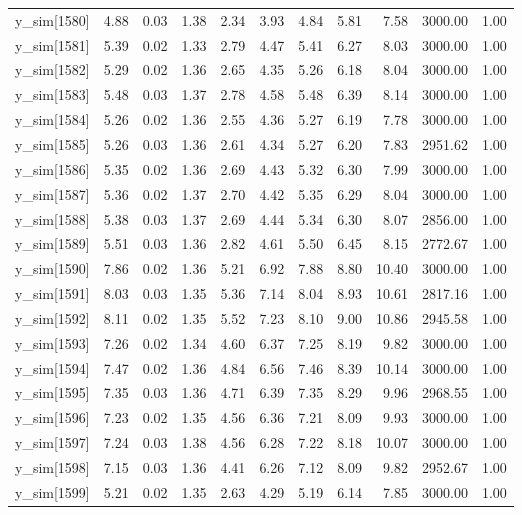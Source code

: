 \begin{table}[ht]
\begin{tabular}{rrrrrrrrrrr}
  y\_sim[1580] & 4.88 & 0.03 & 1.38 & 2.34 & 3.93 & 4.84 & 5.81 & 7.58 & 3000.00 & 1.00 \\ 
  y\_sim[1581] & 5.39 & 0.02 & 1.33 & 2.79 & 4.47 & 5.41 & 6.27 & 8.03 & 3000.00 & 1.00 \\ 
  y\_sim[1582] & 5.29 & 0.02 & 1.36 & 2.65 & 4.35 & 5.26 & 6.18 & 8.04 & 3000.00 & 1.00 \\ 
  y\_sim[1583] & 5.48 & 0.03 & 1.37 & 2.78 & 4.58 & 5.48 & 6.39 & 8.14 & 3000.00 & 1.00 \\ 
  y\_sim[1584] & 5.26 & 0.02 & 1.36 & 2.55 & 4.36 & 5.27 & 6.19 & 7.78 & 3000.00 & 1.00 \\ 
  y\_sim[1585] & 5.26 & 0.03 & 1.36 & 2.61 & 4.34 & 5.27 & 6.20 & 7.83 & 2951.62 & 1.00 \\ 
  y\_sim[1586] & 5.35 & 0.02 & 1.36 & 2.69 & 4.43 & 5.32 & 6.30 & 7.99 & 3000.00 & 1.00 \\ 
  y\_sim[1587] & 5.36 & 0.02 & 1.37 & 2.70 & 4.42 & 5.35 & 6.29 & 8.04 & 3000.00 & 1.00 \\ 
  y\_sim[1588] & 5.38 & 0.03 & 1.37 & 2.69 & 4.44 & 5.34 & 6.30 & 8.07 & 2856.00 & 1.00 \\ 
  y\_sim[1589] & 5.51 & 0.03 & 1.36 & 2.82 & 4.61 & 5.50 & 6.45 & 8.15 & 2772.67 & 1.00 \\ 
  y\_sim[1590] & 7.86 & 0.02 & 1.36 & 5.21 & 6.92 & 7.88 & 8.80 & 10.40 & 3000.00 & 1.00 \\ 
  y\_sim[1591] & 8.03 & 0.03 & 1.35 & 5.36 & 7.14 & 8.04 & 8.93 & 10.61 & 2817.16 & 1.00 \\ 
  y\_sim[1592] & 8.11 & 0.02 & 1.35 & 5.52 & 7.23 & 8.10 & 9.00 & 10.86 & 2945.58 & 1.00 \\ 
  y\_sim[1593] & 7.26 & 0.02 & 1.34 & 4.60 & 6.37 & 7.25 & 8.19 & 9.82 & 3000.00 & 1.00 \\ 
  y\_sim[1594] & 7.47 & 0.02 & 1.36 & 4.84 & 6.56 & 7.46 & 8.39 & 10.14 & 3000.00 & 1.00 \\ 
  y\_sim[1595] & 7.35 & 0.03 & 1.36 & 4.71 & 6.39 & 7.35 & 8.29 & 9.96 & 2968.55 & 1.00 \\ 
  y\_sim[1596] & 7.23 & 0.02 & 1.35 & 4.56 & 6.36 & 7.21 & 8.09 & 9.93 & 3000.00 & 1.00 \\ 
  y\_sim[1597] & 7.24 & 0.03 & 1.38 & 4.56 & 6.28 & 7.22 & 8.18 & 10.07 & 3000.00 & 1.00 \\ 
  y\_sim[1598] & 7.15 & 0.03 & 1.36 & 4.41 & 6.26 & 7.12 & 8.09 & 9.82 & 2952.67 & 1.00 \\ 
  y\_sim[1599] & 5.21 & 0.02 & 1.35 & 2.63 & 4.29 & 5.19 & 6.14 & 7.85 & 3000.00 & 1.00 \\ 

\end{tabular}
\end{table}
